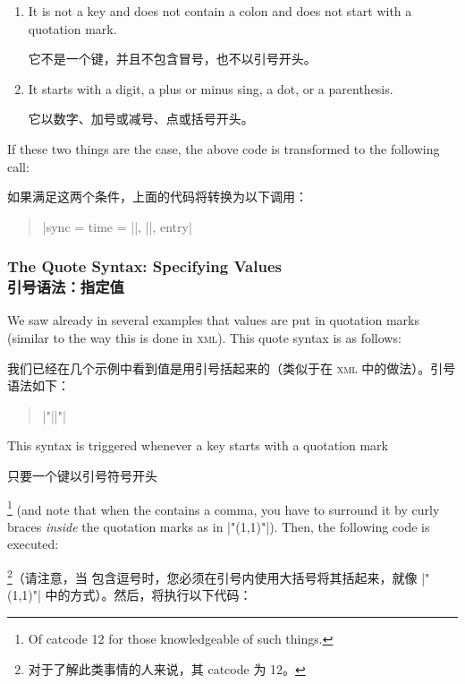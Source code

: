 \begin{enumerate}
    \item It is not a key and does not contain a colon and does not start with
        a quotation mark.

        它不是一个键，并且不包含冒号，也不以引号开头。


    \item It starts with a digit, a plus or minus sing, a dot, or a
        parenthesis.

        它以数字、加号或减号、点或括号开头。


\end{enumerate}

If these two things are the case, the above code is transformed to the
following call:

如果满足这两个条件，上面的代码将转换为以下调用：


\begin{quote}
    \normalfont
    |sync = {time = ||, ||, entry}|
\end{quote}


\subsubsection{The Quote Syntax: Specifying Values\\引号语法：指定值}

We saw already in several examples that values are put in quotation marks
(similar to the way this is done in \textsc{xml}). This quote syntax is as
follows:

我们已经在几个示例中看到值是用引号括起来的（类似于在 \textsc{xml} 中的做法）。引号语法如下：


\begin{quote}
    \normalfont
    |"||"|  
\end{quote}

This syntax is triggered whenever a key starts with a quotation mark%

只要一个键以引号符号开头


\footnote{Of catcode 12 for those knowledgeable of such things.} (and note that
when the  contains a comma, you have to surround it by curly braces
\emph{inside} the quotation marks as in |"{(1,1)}"|). Then, the following code
is executed:

\footnote{对于了解此类事情的人来说，其 catcode 为 12。}（请注意，当  包含逗号时，您必须在引号内使用大括号将其括起来，就像 |"{(1,1)}"| 中的方式）。然后，将执行以下代码：


